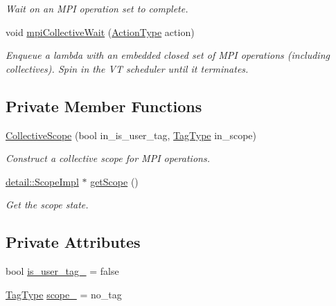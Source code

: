 \begin{DoxyCompactItemize}
\begin{DoxyCompactList}\small\item\em Wait on an M\+PI operation set to complete. \end{DoxyCompactList}\item 
void \hyperlink{structvt_1_1collective_1_1_collective_scope_a0ef41233afe63fc9ead8431e226af193}{mpi\+Collective\+Wait} (\hyperlink{namespacevt_ae0a5a7b18cc99d7b732cb4d44f46b0f3}{Action\+Type} action)
\begin{DoxyCompactList}\small\item\em Enqueue a lambda with an embedded closed set of M\+PI operations (including collectives). Spin in the VT scheduler until it terminates. \end{DoxyCompactList}\end{DoxyCompactItemize}
\subsection*{Private Member Functions}
\begin{DoxyCompactItemize}
\item 
\hyperlink{structvt_1_1collective_1_1_collective_scope_a2b51fd570c218fc089caaded29fd17c9}{Collective\+Scope} (bool in\+\_\+is\+\_\+user\+\_\+tag, \hyperlink{namespacevt_a84ab281dae04a52a4b243d6bf62d0e52}{Tag\+Type} in\+\_\+scope)
\begin{DoxyCompactList}\small\item\em Construct a collective scope for M\+PI operations. \end{DoxyCompactList}\item 
\hyperlink{structvt_1_1collective_1_1detail_1_1_scope_impl}{detail\+::\+Scope\+Impl} $\ast$ \hyperlink{structvt_1_1collective_1_1_collective_scope_a71b296b1ab86bf0814a4863327165f1c}{get\+Scope} ()
\begin{DoxyCompactList}\small\item\em Get the scope state. \end{DoxyCompactList}\end{DoxyCompactItemize}
\subsection*{Private Attributes}
\begin{DoxyCompactItemize}
\item 
bool \hyperlink{structvt_1_1collective_1_1_collective_scope_a2a291ca3421aab53d63088bd84fd7091}{is\+\_\+user\+\_\+tag\+\_\+} = false
\item 
\hyperlink{namespacevt_a84ab281dae04a52a4b243d6bf62d0e52}{Tag\+Type} \hyperlink{structvt_1_1collective_1_1_collective_scope_a6a1b0fe51f68913bd2aeaed363a5eab9}{scope\+\_\+} = no\+\_\+tag
\end{DoxyCompactItemize}
